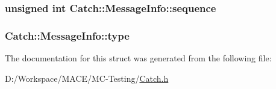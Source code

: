 \subsubsection[{\texorpdfstring{sequence}{sequence}}]{\setlength{\rightskip}{0pt plus 5cm}unsigned {\bf int} Catch\+::\+Message\+Info\+::sequence}\hypertarget{struct_catch_1_1_message_info_a7f4f57ea21e50160adefce7b68a781d6}{}\label{struct_catch_1_1_message_info_a7f4f57ea21e50160adefce7b68a781d6}
\subsubsection[{\texorpdfstring{type}{type}}]{ Catch\+::\+Message\+Info\+::type}\hypertarget{struct_catch_1_1_message_info_ae928b9117465c696e45951d9d0284e78}{}\label{struct_catch_1_1_message_info_ae928b9117465c696e45951d9d0284e78}


The documentation for this struct was generated from the following file\+:\begin{DoxyCompactItemize}
\item 
D\+:/\+Workspace/\+M\+A\+C\+E/\+M\+C-\/\+Testing/\hyperlink{_catch_8h}{Catch.\+h}\end{DoxyCompactItemize}

